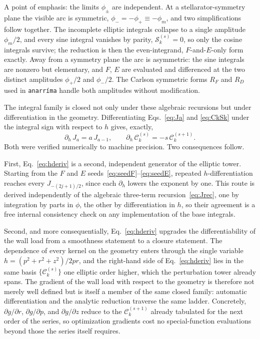 \documentclass[11pt]{article}
\newcommand{\Ck}[2]{\mathcal{C}^{(#2)}_{#1}}
\newcommand{\Sk}[2]{\mathcal{S}^{(#2)}_{#1}}
\newcommand{\Ja}[1]{J_{#1}}
\begin{document}
A point of emphasis: the limits $\phi_\pm$ are independent. At a stellarator-symmetry plane the visible arc is symmetric, $\phi_-=-\phi_+\equiv-\phi_m$, and two simplifications follow together. The incomplete elliptic integrals collapse to a single amplitude $\phi_m/2$, and every sine integral vanishes by parity, $\Sk{k}{s}=0$, so only the cosine integrals survive; the reduction is then the even-integrand, $F$-and-$E$-only form exactly. Away from a symmetry plane the arc is asymmetric: the sine integrals are nonzero but elementary, and $F$, $E$ are evaluated and differenced at the two distinct amplitudes $\phi_+/2$ and $\phi_-/2$. The Carlson symmetric forms $R_F$ and $R_D$~\cite{carlson1979,carlson1995} used in \texttt{anarr\'ima} handle both amplitudes without modification.

The integral family is closed not only under these algebraic recursions but under differentiation in the geometry. Differentiating Eqs.~\eqref{eq:Ja} and \eqref{eq:CkSk} under the integral sign with respect to $h$ gives, exactly,
\begin{equation}
\boxed{\;\partial_h\,\Ja{a}=a\,\Ja{a-1},\qquad
\partial_h\,\Ck{k}{s}=-s\,\Ck{k}{s+1}.\;}
\label{eq:hderiv}
\end{equation}
Both were verified numerically to machine precision. Two consequences follow.

First, Eq.~\eqref{eq:hderiv} is a second, independent generator of the elliptic tower. Starting from the $F$ and $E$ seeds~\eqref{eq:seedF}--\eqref{eq:seedE}, repeated $h$-differentiation reaches every $\Ja{-(2j+1)/2}$, since each $\partial_h$ lowers the exponent by one. This route is derived independently of the algebraic three-term recursion~\eqref{eq:Jrec}, one by integration by parts in $\phi$, the other by differentiation in $h$, so their agreement is a free internal consistency check on any implementation of the base integrals.

Second, and more consequentially, Eq.~\eqref{eq:hderiv} upgrades the differentiability of the wall load from a smoothness statement to a closure statement. The dependence of every kernel on the geometry enters through the single variable $h=(p^2+r^2+z^2)/2pr$, and the right-hand side of Eq.~\eqref{eq:hderiv} lies in the same basis $\{\Ck{k}{s}\}$ one elliptic order higher, which the perturbation tower already spans. The gradient of the wall load with respect to the geometry is therefore not merely well defined but is itself a member of the same closed family: automatic differentiation and the analytic reduction traverse the same ladder. Concretely, $\partial g/\partial r$, $\partial g/\partial p$, and $\partial g/\partial z$ reduce to the $\Ck{k}{s+1}$ already tabulated for the next order of the series, so optimization gradients cost no special-function evaluations beyond those the series itself requires.
\end{document}
